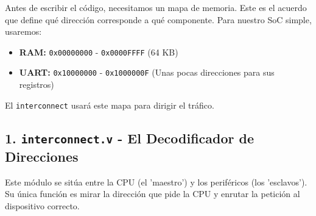 \documentclass[12pt,a4paper]{article}
\begin{document}
Antes de escribir el código, necesitamos un mapa de memoria. Este es el acuerdo que define qué dirección corresponde a qué componente. Para nuestro SoC simple, usaremos:
\begin{itemize}
    \item \textbf{RAM:} \texttt{0x00000000} - \texttt{0x0000FFFF} (64 KB)
    \item \textbf{UART:} \texttt{0x10000000} - \texttt{0x1000000F} (Unas pocas direcciones para sus registros)
\end{itemize}
El \texttt{interconnect} usará este mapa para dirigir el tráfico.

\subsection{1. \texttt{interconnect.v} - El Decodificador de Direcciones}

Este módulo se sitúa entre la CPU (el 'maestro') y los periféricos (los 'esclavos'). Su única función es mirar la dirección que pide la CPU y enrutar la petición al dispositivo correcto.
\end{document}
